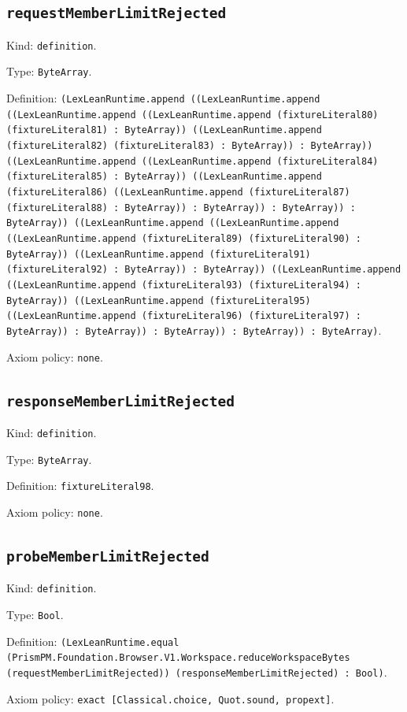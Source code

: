 \documentclass[11pt]{article}
\begin{document}
\subsection*{\texttt{requestMemberLimitRejected}}
\noindent Kind: \texttt{definition}.\par
\noindent Type: \texttt{ByteArray}.\par
\noindent Definition: \texttt{(LexLeanRuntime.append ((LexLeanRuntime.append ((LexLeanRuntime.append ((LexLeanRuntime.append (fixtureLiteral80) (fixtureLiteral81) : ByteArray)) ((LexLeanRuntime.append (fixtureLiteral82) (fixtureLiteral83) : ByteArray)) : ByteArray)) ((LexLeanRuntime.append ((LexLeanRuntime.append (fixtureLiteral84) (fixtureLiteral85) : ByteArray)) ((LexLeanRuntime.append (fixtureLiteral86) ((LexLeanRuntime.append (fixtureLiteral87) (fixtureLiteral88) : ByteArray)) : ByteArray)) : ByteArray)) : ByteArray)) ((LexLeanRuntime.append ((LexLeanRuntime.append ((LexLeanRuntime.append (fixtureLiteral89) (fixtureLiteral90) : ByteArray)) ((LexLeanRuntime.append (fixtureLiteral91) (fixtureLiteral92) : ByteArray)) : ByteArray)) ((LexLeanRuntime.append ((LexLeanRuntime.append (fixtureLiteral93) (fixtureLiteral94) : ByteArray)) ((LexLeanRuntime.append (fixtureLiteral95) ((LexLeanRuntime.append (fixtureLiteral96) (fixtureLiteral97) : ByteArray)) : ByteArray)) : ByteArray)) : ByteArray)) : ByteArray)}.\par
\noindent Axiom policy: \texttt{none}.\par
\subsection*{\texttt{responseMemberLimitRejected}}
\noindent Kind: \texttt{definition}.\par
\noindent Type: \texttt{ByteArray}.\par
\noindent Definition: \texttt{fixtureLiteral98}.\par
\noindent Axiom policy: \texttt{none}.\par
\subsection*{\texttt{probeMemberLimitRejected}}
\noindent Kind: \texttt{definition}.\par
\noindent Type: \texttt{Bool}.\par
\noindent Definition: \texttt{(LexLeanRuntime.equal (PrismPM.Foundation.Browser.V1.Workspace.reduceWorkspaceBytes (requestMemberLimitRejected)) (responseMemberLimitRejected) : Bool)}.\par
\noindent Axiom policy: \texttt{exact [Classical.choice, Quot.sound, propext]}.\par
\end{document}
